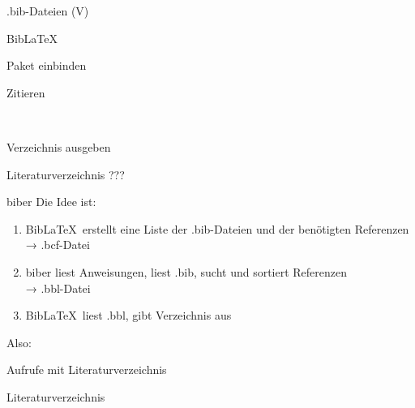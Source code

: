\begin{frame}{.bib-Dateien (V)}
  \bibexamplev
\end{frame}

\begin{frame}[fragile]{Bib\LaTeX}
  \begin{block}{Paket einbinden}
    \begin{lstverbatim}
    \usepackage[backend=biber]{biblatex}
    
    \end{lstverbatim}
  \end{block}
  \begin{block}{Zitieren}
      \begin{minipage}{0.6\linewidth}
        \begin{lstverbatim}
        \cite{numpy}
        \cite{splot,root}
        \end{lstverbatim}
      \end{minipage}
      \begin{minipage}{0.35\linewidth}
        \cite{numpy}\\
        \cite{splot,root}
      \end{minipage}
  \end{block}
  \begin{block}{Verzeichnis ausgeben}
    \begin{lstverbatim}
    \nocite{anleitung01} %
    \nocite{*}           %
    \printbibliography
    \end{lstverbatim}
  \end{block}
\end{frame}

\begin{frame}{Literaturverzeichnis}
  \centering
  \pause
  \Huge ???
\end{frame}

\begin{frame}[fragile]{biber}
  Die Idee ist:
  \begin{enumerate}
    \item Bib\LaTeX\ erstellt eine Liste der .bib-Dateien und der benötigten Referenzen\\
          → .bcf-Datei
    \item biber liest Anweisungen, liest .bib, sucht und sortiert Referenzen\\
          → .bbl-Datei
    \item Bib\LaTeX\ liest .bbl, gibt Verzeichnis aus
  \end{enumerate}

  \vspace{10pt}
  Also:
  \begin{block}{Aufrufe mit Literaturverzeichnis}
  \end{block}
\end{frame}

\begin{frame}{Literaturverzeichnis}
  \nocite{*}
  \printbibliography
\end{frame}
